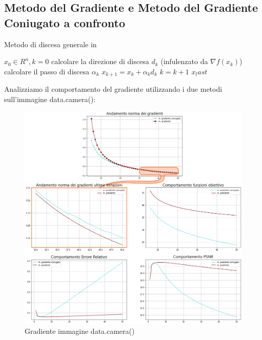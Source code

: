 {\color{oorange}\subsection{Metodo del Gradiente e Metodo del Gradiente Coniugato a confronto}}

\begin{algorithm}[H]
	\caption*{Metodo di discesa generale in }\label{alg:mg}
	\begin{algorithmic}[1]
		\State $x_0 \in R^n, k=0$
            \State calcolare la direzione di discesa $d_k$ (infulenzato da $\nabla f(x_k)$)
            \State calcolare il passo di discesa $\alpha_k$
            \State $x_{k+1} = x_k+\alpha_kd_k$
            \State $k = k+1$
        \EndWhile
        \State \Return $x_last$
	\end{algorithmic}
\end{algorithm}

Analizziamo il comportamento del gradiente utilizzando i due metodi sull'immagine data.camera():
\begin{figure}[H]
    \centering
    \includegraphics[width=\textwidth]{output/MGCvsMG-enph.png}
    \caption{Gradiente immagine data.camera()}
    \label{fig:MGCvsMGdatacamera}
\end{figure}

